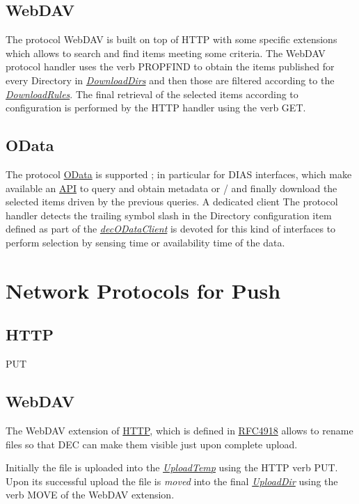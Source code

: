 \documentclass[dec_sum_main.tex]{subfiles}
\begin{document}
\subsection{WebDAV}
The protocol WebDAV is built on top of HTTP with some specific extensions which allows to search and find items meeting some criteria. The WebDAV protocol handler uses the verb PROPFIND to obtain the items published for every Directory in \hyperref[DownloadDirs]{\textit{DownloadDirs}} and then those are filtered according to the \hyperref[DownloadRules]{\textit{DownloadRules}}.
The final retrieval of the selected items according to configuration is performed by the HTTP handler using the verb GET.

\subsection{OData}
The protocol \href{https://docs.oasis-open.org/odata/odata/v4.01/odata-v4.01-part1-protocol.html}{OData} is supported ; in particular for DIAS interfaces, which make available an \href{https://scihub.copernicus.eu/userguide/ODataAPI}{API} to query and obtain metadata or / and finally download the selected items driven by the previous queries.
A dedicated client The protocol handler detects the trailing symbol slash in the Directory configuration item defined as part of the \hyperref[decODataClient]{\textit{decODataClient}} is devoted for this kind of interfaces to perform selection by sensing time or availability time of the data.

\section{Network Protocols for Push}

\subsection{HTTP}
PUT

\subsection{WebDAV}
The WebDAV extension of \href{https://www.w3.org/Protocols/rfc2616/rfc2616-sec9.html}{HTTP}, which is defined in \href{https://tools.ietf.org/html/rfc4918}{RFC4918} allows to rename files so that DEC can make them visible just upon complete upload.

\par
\noindent
Initially the file is uploaded into the \hyperref[UploadTemp]{\textit{UploadTemp}} using the HTTP verb PUT. Upon its successful upload the file is \textit{moved} into the final \hyperref[UploadDir]{\textit{UploadDir}} using the verb MOVE of the WebDAV extension.
\end{document}
